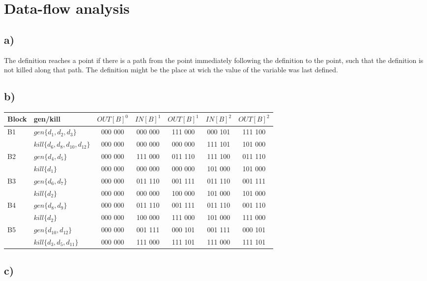 \section{Data-flow analysis}
\subsection*{a)}
The definition reaches a point if there is a path from the point immediately following the definition to the point, such that the definition is not killed along that path. The definition might be the place at wich the value of the variable was last defined.
\subsection*{b)}
\begin{tabular}{|l|l|c c c c c |}
\hline
Block	&	gen/kill & $OUT[B]^0$ & $IN[B]^1$ & $OUT[B]^1$ & $IN[B]^2$ & $OUT[B]^2$	\\
\hline								%
\hline							
\multirow{2}{*}{B1} 	& $gen\{d_1, d_2, d_3\}$ 		& 000 000 & 000 000 & 111 000 & 000 101 & 111 100  	\\
			& $kill\{d_6, d_8, d_{10}, d_{12}\}$  	& 000 000 & 000 000 & 000 000 & 111 101 & 101 000 	\\
\hline
\multirow{2}{*}{B2} 	& $gen\{d_4, d_5\}$	 		& 000 000 & 111 000 & 011 110 & 111 100 & 011 110  	\\
			& $kill\{d_1	\}$  			& 000 000 & 000 000 & 000 000 & 101 000 & 101 000 	\\
\hline
\multirow{2}{*}{B3} 	& $gen\{d_6, d_7\}$			& 000 000 & 011 110 & 001 111 & 011 110 & 001 111  	\\
			& $kill\{d_2	\}$			& 000 000 & 000 000 & 100 000 & 101 000 & 101 000 	\\
\hline
\multirow{2}{*}{B4} 	& $gen\{d_8, d_9\}$			& 000 000 & 011 110 & 001 111 & 011 110 & 001 110  	\\
			& $kill\{d_2	\}$			& 000 000 & 100 000 & 111 000 & 101 000 & 111 000 	\\
\hline
\multirow{2}{*}{B5} 	& $gen\{d_{10}, d_{12}\}$		& 000 000 & 001 111 & 000 101 & 001 111 & 000 101  	\\
			& $kill\{d_3, d_5, d_{11}\}$		& 000 000 & 111 000 & 111 101 & 111 000 & 111 101 	\\
\hline
\end{tabular}


\subsection{c)}

